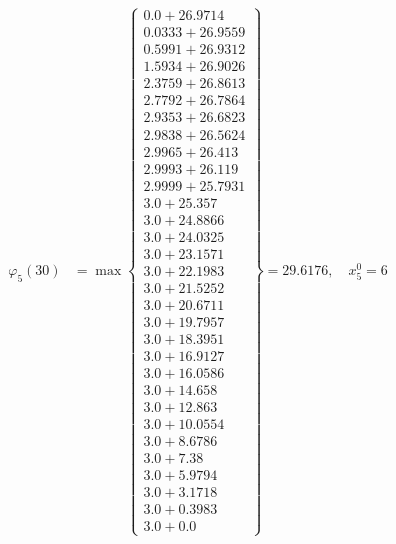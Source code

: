 \documentclass{article}
\begin{document}
\begin{align*}
\varphi_{5}(30) &= \max \left\{ \begin{array}{c}
0.0 + 26.9714 \\
 0.0333 + 26.9559 \\
 0.5991 + 26.9312 \\
 1.5934 + 26.9026 \\
 2.3759 + 26.8613 \\
 2.7792 + 26.7864 \\
 2.9353 + 26.6823 \\
 2.9838 + 26.5624 \\
 2.9965 + 26.413 \\
 2.9993 + 26.119 \\
 2.9999 + 25.7931 \\
 3.0 + 25.357 \\
 3.0 + 24.8866 \\
 3.0 + 24.0325 \\
 3.0 + 23.1571 \\
 3.0 + 22.1983 \\
 3.0 + 21.5252 \\
 3.0 + 20.6711 \\
 3.0 + 19.7957 \\
 3.0 + 18.3951 \\
 3.0 + 16.9127 \\
 3.0 + 16.0586 \\
 3.0 + 14.658 \\
 3.0 + 12.863 \\
 3.0 + 10.0554 \\
 3.0 + 8.6786 \\
 3.0 + 7.38 \\
 3.0 + 5.9794 \\
 3.0 + 3.1718 \\
 3.0 + 0.3983 \\
 3.0 + 0.0
\end{array} \right\}=29.6176, \quad x_{5}^0=6\\
  

\end{align*}
\end{document}
